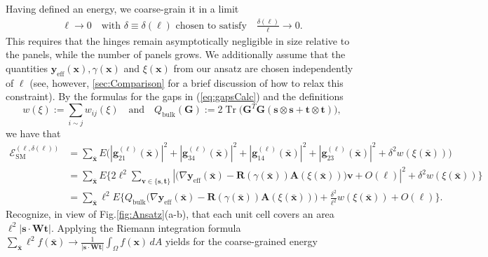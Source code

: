 \documentclass[aps,11pt,tightenlines,notitlepage,superscriptaddress,longbibliography,nofootinbib]{revtex4-1}
\DeclareMathOperator{\Tr}{Tr}
\begin{document}
Having defined an energy, we coarse-grain it in a limit 
\begin{equation}
    \begin{aligned}\label{eq:asymtotics}
    \ell \rightarrow 0 \quad \text{with $\delta \equiv \delta(\ell)$ chosen to satisfy} \quad \frac{\delta(\ell)}{\ell} \rightarrow 0.
    \end{aligned}
\end{equation}
This requires that the hinges remain asymptotically negligible in size relative to the panels, while the number of panels grows. We additionally assume that the quantities $\mathbf{y}_{\text{eff}}(\mathbf{x}), \gamma(\mathbf{x})$ and $\xi(\mathbf{x})$ from our ansatz are chosen independently of $\ell$ (see, however, \ref{sec:Comparison} for a brief discussion of how to relax this constraint). By the formulas for the gaps in (\ref{eq:gapsCalc}) and the definitions 
\begin{equation}
   w(\xi):= \sum_{i \sim j} w_{ij}(\xi)  \quad\text{and}\quad Q_{\text{bulk}}(\mathbf{G}) :=2\Tr\Big( \mathbf{G}^T\mathbf{G} ( \mathbf{s} \otimes \mathbf{s} + \mathbf{t} \otimes \mathbf{t})\Big),
\end{equation} 
we have that
\begin{equation}
    \begin{aligned}
    \mathcal{E}_{\text{SM}}^{(\ell,\delta(\ell))} &=\sum_{\bar{\mathbf{x}}}E \Big(|\mathbf{g}_{21}^{(\ell)}(\bar{\mathbf{x}})|^2 + |\mathbf{g}_{34}^{(\ell)}(\bar{\mathbf{x}})|^2  + |\mathbf{g}_{14}^{(\ell)}(\bar{\mathbf{x}})|^2 + |\mathbf{g}_{23}^{(\ell)}(\bar{\mathbf{x}})|^2 + \delta^2 w(\xi(\bar{\mathbf{x}})) \Big)  \\
    &= \sum_{\bar{\mathbf{x}}}E \Big\{2\ell^2  \sum_{\mathbf{v} \in \{\mathbf{s},\mathbf{t}\}}|\big(\nabla \mathbf{y}_{\text{eff}}(\bar{\mathbf{x}}) - \mathbf{R}(\gamma(\bar{\mathbf{x}})) \mathbf{A}(\xi(\bar{\mathbf{x}}))  \big) \mathbf{v} + O(\ell)|^2  + \delta^2 w(\xi(\bar{\mathbf{x}})) \Big\} \\
    &=\sum_{\bar{\mathbf{x}}} \ell^2 E \Big\{  Q_{\text{bulk}}\Big(\nabla \mathbf{y}_{\text{eff}}(\bar{\mathbf{x}}) - \mathbf{R}(\gamma(\bar{\mathbf{x}})) \mathbf{A}(\xi(\bar{\mathbf{x}}))  \Big) + \frac{\delta^2}{\ell^2}w(\xi(\bar{\mathbf{x}})) + O(\ell) \Big\}.
    \end{aligned}
\end{equation}
Recognize, in view of Fig.\;\ref{fig:Ansatz}(a-b), that each unit cell covers an area  $\ell^2 |\mathbf{s} \cdot \mathbf{W} \mathbf{t}|$. Applying the Riemann integration formula   $\sum_{\bar{\mathbf{x}}}\ell^2 f(\bar{\mathbf{x}}) \to \frac{1}{|\mathbf{s} \cdot \mathbf{W} \mathbf{t}|}\int_{\Omega} f(\mathbf{x})\, dA$ yields for the coarse-grained energy
\end{document}
